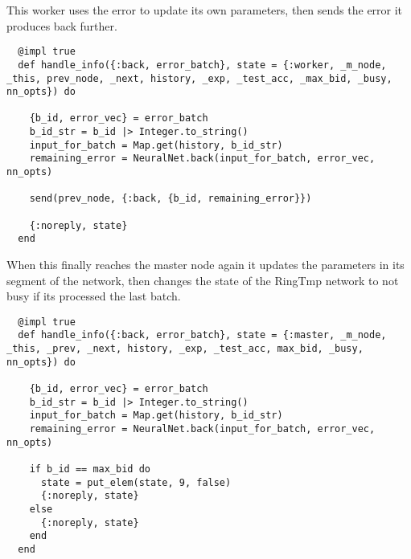 This worker uses the error to update its own parameters, then
sends the error it produces back further.
\begin{lstlisting}
  @impl true
  def handle_info({:back, error_batch}, state = {:worker, _m_node, _this, prev_node, _next, history, _exp, _test_acc, _max_bid, _busy, nn_opts}) do

    {b_id, error_vec} = error_batch
    b_id_str = b_id |> Integer.to_string()
    input_for_batch = Map.get(history, b_id_str)
    remaining_error = NeuralNet.back(input_for_batch, error_vec, nn_opts)

    send(prev_node, {:back, {b_id, remaining_error}})

    {:noreply, state}
  end
\end{lstlisting}

When this finally reaches the master node again it updates the parameters in its
segment of the network, then changes the state of the RingTmp network to not busy
if its processed the last batch.
\begin{lstlisting}
  @impl true
  def handle_info({:back, error_batch}, state = {:master, _m_node, _this, _prev, _next, history, _exp, _test_acc, max_bid, _busy, nn_opts}) do

    {b_id, error_vec} = error_batch
    b_id_str = b_id |> Integer.to_string()
    input_for_batch = Map.get(history, b_id_str)
    remaining_error = NeuralNet.back(input_for_batch, error_vec, nn_opts)

    if b_id == max_bid do
      state = put_elem(state, 9, false)
      {:noreply, state}
    else
      {:noreply, state}
    end
  end
\end{lstlisting}







